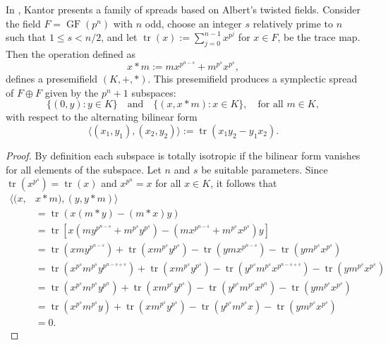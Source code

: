 \documentclass[a4paper, 11pt]{article}
\DeclareMathOperator{\GF}{GF}
\DeclareMathOperator{\tr}{tr}
\begin{document}
  In \cite{bader}, Kantor presents a family of spreads based
  on Albert's twisted fields.  Consider the field $F =
  \GF(p^{n})$ with $n$ odd, choose an integer $s$ relatively
  prime to $n$ such that $1 \leq s < n / 2$, and let $\tr(x)
  := \sum_{j=0}^{n-1} x^{p^{j}}$ for $x \in F$, be the trace
  map. Then the operation defined as
  \begin{equation}
    x * m := mx^{p^{n-s}} + m^{p^{s}} x^{p^{s}},
  \end{equation}
  defines a presemifield $(K,+,*)$. This presemifield
  produces a symplectic spread of $F \oplus F$ given by the
  $p^{n}+1$ subspaces:
  \begin{equation}
    \{(0,y) : y \in K\}
    \quad \text{and} \quad
    \{(x,x * m) : x \in K\},
    \quad \text{for all } m \in K,
  \end{equation}
  with respect to the alternating bilinear form
  \begin{equation}
    \langle (x_1,y_1), (x_2,y_2) \rangle
    := \tr\left( x_1y_2 - y_1x_2 \right).
  \end{equation}
  \begin{proof}
    By definition each subspace is totally isotropic if the
    bilinear form vanishes for all elements of the subspace.
    Let $n$ and $s$ be suitable parameters. Since
    $\tr\left(x^{p^{s}}\right) = \tr(x)$ and $x^{p^{n}} = x$
    for all $x \in K$, it follows that
    \begin{align}
      \langle (x, &x * m), (y, y * m) \rangle \\
      &= \tr\left( x(m*y) - (m*x)y \right) \\
      &= \tr\left[x\left(
          my^{p^{n-s}} + m^{p^{s}}y^{p^{s}}
        \right) 
        - \left(
          mx^{p^{n-s}} + m^{p^{s}}x^{p^{s}}
        \right) y
      \right] \\
      &= \tr\left( xmy^{p^{n-s}} \right)
      + \tr\left( xm^{p^{s}}y^{p^{s}} \right) 
      - \tr\left( ymx^{p^{n-s}}  \right)
      - \tr\left( ym^{p^{s}}x^{p^{s}} \right) \\
      &= \tr\left( x^{p^{s}}m^{p^{s}}y^{p^{n-s+s}} \right) 
      + \tr\left( xm^{p^{s}}y^{p^{s}} \right) 
      - \tr\left( y^{p^{s}}m^{p^{s}}x^{p^{n-s+s}} \right) 
      - \tr\left( ym^{p^{s}}x^{p^{s}} \right) \\
      &= \tr\left( x^{p^{s}}m^{p^{s}}y^{p^{n}} \right) 
      + \tr\left( xm^{p^{s}}y^{p^{s}} \right) 
      - \tr\left( y^{p^{s}}m^{p^{s}}x^{p^{n}} \right) 
      - \tr\left( ym^{p^{s}}x^{p^{s}} \right) \\
      &= \tr\left( x^{p^{s}}m^{p^{s}}y \right) +
      \tr\left( xm^{p^{s}}y^{p^{s}} \right) 
      - \tr\left( y^{p^{s}}m^{p^{s}}x \right) 
      - \tr\left( ym^{p^{s}}x^{p^{s}} \right) \\
      &= 0.
    \end{align}
  \end{proof}
\end{document}
